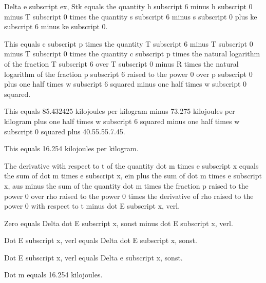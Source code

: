 Delta e subscript ex, Stk equals the quantity h subscript 6 minus h subscript 0 minus T subscript 0 times the quantity s subscript 6 minus s subscript 0 plus ke subscript 6 minus ke subscript 0.

This equals c subscript p times the quantity T subscript 6 minus T subscript 0 minus T subscript 0 times the quantity c subscript p times the natural logarithm of the fraction T subscript 6 over T subscript 0 minus R times the natural logarithm of the fraction p subscript 6 raised to the power 0 over p subscript 0 plus one half times w subscript 6 squared minus one half times w subscript 0 squared.

This equals 85.432425 kilojoules per kilogram minus 73.275 kilojoules per kilogram plus one half times w subscript 6 squared minus one half times w subscript 0 squared plus 40.55.55.7.45.

This equals 16.254 kilojoules per kilogram.

The derivative with respect to t of the quantity dot m times e subscript x equals the sum of dot m times e subscript x, ein plus the sum of dot m times e subscript x, aus minus the sum of the quantity dot m times the fraction p raised to the power 0 over rho raised to the power 0 times the derivative of rho raised to the power 0 with respect to t minus dot E subscript x, verl.

Zero equals Delta dot E subscript x, sonst minus dot E subscript x, verl.

Dot E subscript x, verl equals Delta dot E subscript x, sonst.

Dot E subscript x, verl equals Delta e subscript x, sonst.

Dot m equals 16.254 kilojoules.